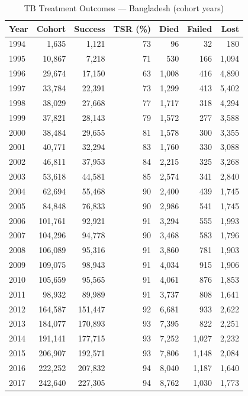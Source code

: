 \begin{table}[htbp]
\centering
\caption{TB Treatment Outcomes — Bangladesh (cohort years)}
\label{tab:outcomes}
\small
\begin{tabular}{lrrrrrr}
\toprule
\textbf{Year} & \textbf{Cohort} & \textbf{Success} & \textbf{TSR (\%)} & \textbf{Died} & \textbf{Failed} & \textbf{Lost} \\
\midrule
1994 & 1,635 & 1,121 & 73 & 96 & 32 & 180 \\
1995 & 10,867 & 7,218 & 71 & 530 & 166 & 1,094 \\
1996 & 29,674 & 17,150 & 63 & 1,008 & 416 & 4,890 \\
1997 & 33,784 & 22,391 & 73 & 1,299 & 413 & 5,402 \\
1998 & 38,029 & 27,668 & 77 & 1,717 & 318 & 4,294 \\
1999 & 37,821 & 28,143 & 79 & 1,572 & 277 & 3,588 \\
2000 & 38,484 & 29,655 & 81 & 1,578 & 300 & 3,355 \\
2001 & 40,771 & 32,294 & 83 & 1,760 & 330 & 3,088 \\
2002 & 46,811 & 37,953 & 84 & 2,215 & 325 & 3,268 \\
2003 & 53,618 & 44,581 & 85 & 2,574 & 341 & 2,840 \\
2004 & 62,694 & 55,468 & 90 & 2,400 & 439 & 1,745 \\
2005 & 84,848 & 76,833 & 90 & 2,986 & 541 & 1,745 \\
2006 & 101,761 & 92,921 & 91 & 3,294 & 555 & 1,993 \\
2007 & 104,296 & 94,778 & 90 & 3,468 & 583 & 1,796 \\
2008 & 106,089 & 95,316 & 91 & 3,860 & 781 & 1,903 \\
2009 & 109,075 & 98,943 & 91 & 4,034 & 915 & 1,906 \\
2010 & 105,659 & 95,565 & 91 & 4,061 & 876 & 1,853 \\
2011 & 98,932 & 89,989 & 91 & 3,737 & 808 & 1,641 \\
2012 & 164,587 & 151,447 & 92 & 6,681 & 933 & 2,622 \\
2013 & 184,077 & 170,893 & 93 & 7,395 & 822 & 2,251 \\
2014 & 191,141 & 177,715 & 93 & 7,252 & 1,027 & 2,232 \\
2015 & 206,907 & 192,571 & 93 & 7,806 & 1,148 & 2,084 \\
2016 & 222,252 & 207,832 & 94 & 8,040 & 1,187 & 1,640 \\
2017 & 242,640 & 227,305 & 94 & 8,762 & 1,030 & 1,773 \\

\end{tabular}
\end{table}
